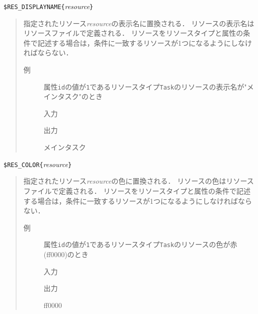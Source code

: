 {\nopagebreak
\noindent
\verb|$RES_DISPLAYNAME{|\textit{resource}\verb|}|
\vspace{-0.5zw}
\begin{quote}
指定されたリソース{\it resource}の表示名に置換される．
リソースの表示名はリソースファイルで定義される．
リソースをリソースタイプと属性の条件で記述する場合は，条件に一致するリソースが1つになるようにしなければならない．

\begin{description}
\item[例] 属性{\tt id}の値が{\tt 1}であるリソースタイプ{\tt Task}のリソースの表示名が"メインタスク"のとき

\hspace*{-1zw}入力\vspace{-1.75zw}
\hspace*{-1zw}出力\vspace{-1.75zw}
\begin{EBNF}
メインタスク
\end{EBNF}
\end{description}

\end{quote}
}
{\nopagebreak
\noindent
\verb|$RES_COLOR{|\textit{resource}\verb|}|
\vspace{-0.5zw}
\begin{quote}
指定されたリソース{\it resource}の色に置換される．
リソースの色はリソースファイルで定義される．
リソースをリソースタイプと属性の条件で記述する場合は，条件に一致するリソースが1つになるようにしなければならない．

\begin{description}
\item[例] 属性{\tt id}の値が{\tt 1}であるリソースタイプ{\tt Task}のリソースの色が赤(ff0000)のとき

\hspace*{-1zw}入力\vspace{-1.75zw}
\hspace*{-1zw}出力\vspace{-1.75zw}
\begin{EBNF}
ff0000
\end{EBNF}
\end{description}

\end{quote}
}

